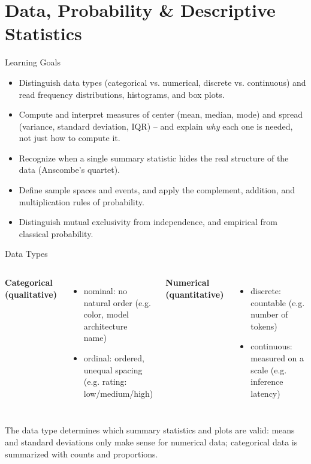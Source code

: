 \section{Data, Probability \& Descriptive Statistics}

\begin{frame}{Learning Goals}
\begin{itemize}
  \item Distinguish data types (categorical vs. numerical, discrete vs. continuous) and read frequency distributions, histograms, and box plots.
  \pause
  \item Compute and interpret measures of center (mean, median, mode) and spread (variance, standard deviation, IQR) -- and explain \emph{why} each one is needed, not just how to compute it.
  \pause
  \item Recognize when a single summary statistic hides the real structure of the data (Anscombe's quartet).
  \pause
  \item Define sample spaces and events, and apply the complement, addition, and multiplication rules of probability.
  \pause
  \item Distinguish mutual exclusivity from independence, and empirical from classical probability.
\end{itemize}
\end{frame}

\begin{frame}{Data Types}
\begin{columns}[T]
\textbf{Categorical (qualitative)}
\begin{itemize}
  \item nominal: no natural order (e.g. color, model architecture name)
  \pause
  \item ordinal: ordered, unequal spacing (e.g. rating: low/medium/high)
\end{itemize}

\pause
{}
\textbf{Numerical (quantitative)}
\begin{itemize}
  \item discrete: countable (e.g. number of tokens)
  \pause
  \item continuous: measured on a scale (e.g. inference latency)
\end{itemize}
\end{columns}

\pause
\begin{rlintuition}
The data type determines which summary statistics and plots are valid: means and standard deviations only make sense for numerical data; categorical data is summarized with counts and proportions.
\end{rlintuition}
\end{frame}

